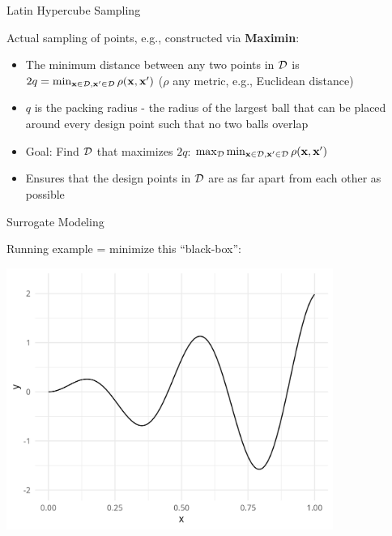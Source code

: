 \documentclass[11pt,compress,t,notes=noshow, xcolor=table]{beamer}
\begin{document}
\begin{frame}{Latin Hypercube Sampling}

Actual sampling of points, e.g., constructed via \textbf{Maximin}:\\
\begin{itemize}
\item The minimum distance between any two points in $\mathcal{D}$ is $2q = \min_{\mathbf{x} \in \mathcal{D}, \mathbf{x}' \in \mathcal{D}} \rho(\mathbf{x}, \mathbf{x}')$ ($\rho$ any metric, e.g., Euclidean distance)
\item $q$ is the packing radius - the radius of the largest ball that can be placed around every design point such that no two balls overlap
\item Goal: Find $\mathcal{D}$ that maximizes $2q$: $\max_{\mathcal{D}} \min_{\mathbf{x} \in \mathcal{D}, \mathbf{x}' \in \mathcal{D}} \rho(\mathbf{x}, \mathbf{x}')$
\item Ensures that the design points in $\mathcal{D}$ are as far apart from each other as possible
\end{itemize}

\end{frame}

\begin{frame}{Surrogate Modeling}

Running example = minimize this \enquote{black-box}:

\begin{center}
  \includegraphics[width = 0.8\textwidth]{figure_man/loop_0.png}
\end{center}

\end{frame}
\end{document}

